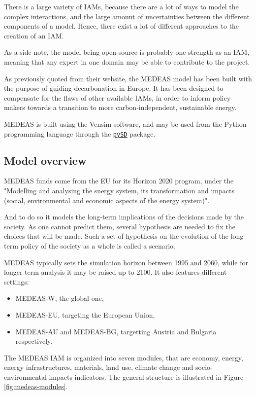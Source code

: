 There is a large variety of IAMs, because there are a lot of ways to model the complex interactions, and the large amount of uncertainties between the different components of a model. Hence, there exist a lot of different approaches to the creation of an IAM.

As a side note, the model being open-source is probably one strength as an IAM, meaning that any expert in one domain may be able to contribute to the project.

As previously quoted from their website, the MEDEAS model has been built with the purpose of guiding decarbonation in Europe. It has been designed to compensate for the flaws of other available IAMs, in order to inform policy makers towards a transition to more carbon-independent, sustainable energy.

MEDEAS is built using the Vensim software, and may be used from the Python programming language through the \href{https://pypi.org/project/pysd/}{\texttt{pySD}} package.

\subsection{Model overview}

MEDEAS funds come from the EU for its Horizon 2020 program, under the "Modelling and analysing the snergy system, its transformation and impacts (social, environmental and economic aspects of the energy system)".

And to do so it models the long-term implications of the decisions made by the society. As one cannot predict them, several hypothesis are needed to fix the choices that will be made. Such a set of hypothesis on the evolution of the long-term policy of the society as a whole is called a scenario.

MEDEAS typically sets the simulation horizon between 1995 and 2060, while for longer term analysis it may be raised up to 2100. It also features different settings:
\begin{itemize}
    \item MEDEAS-W, the global one,
    \item MEDEAS-EU, targeting the European Union,
    \item MEDEAS-AU and MEDEAS-BG, targetting Austria and Bulgaria respectively.
\end{itemize}

The MEDEAS IAM is organized into seven modules, that are economy, energy, energy infrastructures, materials, land use, climate change and socio-environmental impacts indicators. The general structure is illustrated in Figure \ref{fig:medeas-modules}.

